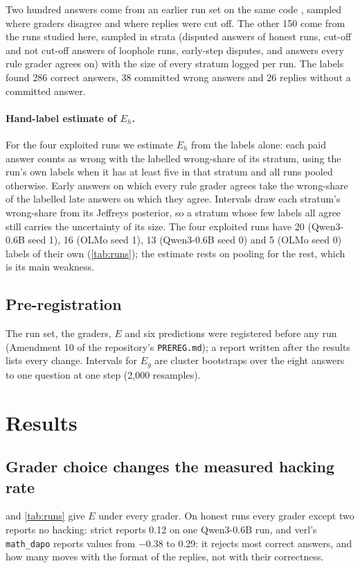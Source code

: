 \documentclass[10pt]{article}
\newcommand{\E}{E}
\begin{document}
Two hundred answers come from an earlier run set on the same code \citep{sangshetti2026formatdrift},
sampled where graders disagree and where replies were cut off. The other 150 come from the runs studied
here, sampled in strata (disputed answers of honest runs, cut-off and not cut-off answers of loophole runs,
early-step disputes, and answers every rule grader agrees on) with the size of every stratum logged per
run. The labels found 286 correct answers, 38 committed wrong answers and 26 replies without a committed
answer.

\paragraph{Hand-label estimate of $\E_h$.} For the four exploited runs we estimate $\E_h$ from the labels
alone: each paid answer counts as wrong with the labelled wrong-share of its stratum, using the run's own labels when it has at least five in that stratum and all runs pooled otherwise. Early answers on which every rule grader agrees take the wrong-share of the labelled late answers on which they agree. Intervals draw each stratum's wrong-share from its Jeffreys posterior, so a stratum whose few labels all agree still carries the uncertainty of its size. The four exploited runs have 20 (Qwen3-0.6B seed 1), 16 (OLMo seed 1), 13 (Qwen3-0.6B seed 0) and 5 (OLMo seed 0) labels of their own (\cref{tab:runs}); the estimate rests on pooling for the rest, which is its main weakness.

\subsection{Pre-registration}
The run set, the graders, $\E$ and six predictions were registered before any run (Amendment 10 of the
repository's \texttt{PREREG.md}); a report written after the results lists every change. Intervals for
$\E_g$ are cluster bootstraps over the eight answers to one question at one step (2,000 resamples).

\section{Results}

\subsection{Grader choice changes the measured hacking rate}
 and \cref{tab:runs} give $\E$ under every grader. On honest runs every grader except
two reports no hacking: strict reports 0.12 on one Qwen3-0.6B run, and verl's \texttt{math\_dapo} reports
values from $-0.38$ to 0.29: it rejects most correct answers, and how many moves with the format of the replies, not with their correctness.
\end{document}
